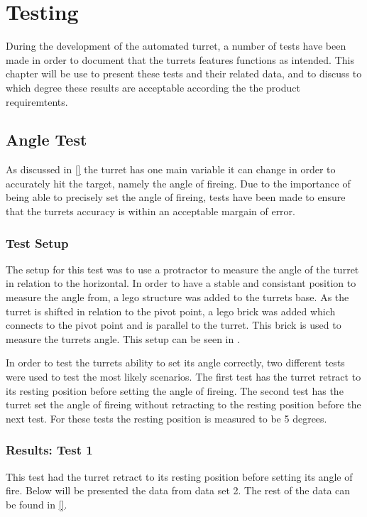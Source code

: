 \chapter{Testing}
During the development of the automated turret, a number of tests have been made
in order to document that the turrets features functions as intended. This
chapter will be use to present these tests and their related data, and to
discuss to which degree these results are acceptable according the the product
requiremtents.

\section{Angle Test}
As discussed in \autoref{} the turret has one main variable it can change in
order to accurately hit the target, namely the angle of fireing. Due to the
importance of being able to precisely set the angle of fireing, tests have been
made to ensure that the turrets accuracy is within an acceptable margain of
error.

\subsection{Test Setup}
The setup for this test was to use a protractor to measure the angle of the
turret in relation to the horizontal. In order to have a stable and
consistant position to measure the angle from, a lego structure was added to the
turrets base. As the turret is shifted in relation to the pivot point, a lego
brick was added which connects to the pivot point and is parallel to the turret.
This brick is used to measure the turrets angle. This setup can be seen in
.

In order to test the turrets ability to set its angle correctly, two different
tests were used to test the most likely scenarios. The first test has the turret
retract to its resting position before setting the angle of fireing. The second
test has the turret set the angle of fireing without retracting to the resting
position before the next test. For these tests the resting position is measured
to be 5 degrees.

\subsection{Results: Test 1}
This test had the turret retract to its resting position before setting its
angle of fire. Below will be presented the data from data set 2. The rest
of the data can be found in \autoref{}. 

